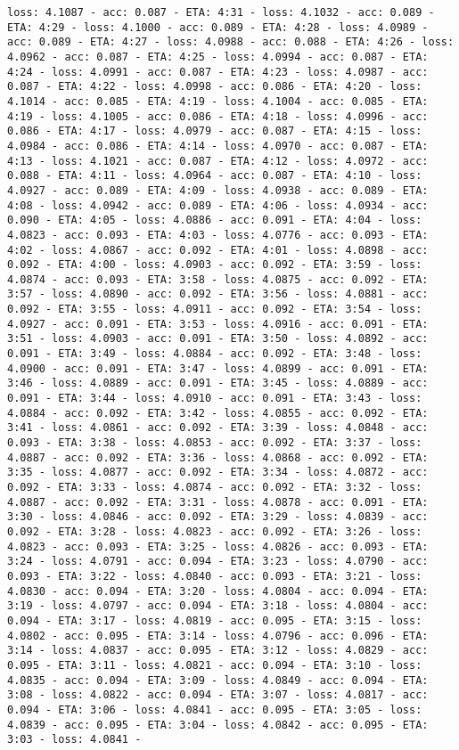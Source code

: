 \documentclass[11pt]{article}
\begin{document}
\begin{Verbatim}[commandchars=\\\{\}]
loss: 4.1087 - acc: 0.087 - ETA: 4:31 - loss: 4.1032 - acc: 0.089 - ETA: 4:29 - loss: 4.1000 - acc: 0.089 - ETA: 4:28 - loss: 4.0989 - acc: 0.089 - ETA: 4:27 - loss: 4.0988 - acc: 0.088 - ETA: 4:26 - loss: 4.0962 - acc: 0.087 - ETA: 4:25 - loss: 4.0994 - acc: 0.087 - ETA: 4:24 - loss: 4.0991 - acc: 0.087 - ETA: 4:23 - loss: 4.0987 - acc: 0.087 - ETA: 4:22 - loss: 4.0998 - acc: 0.086 - ETA: 4:20 - loss: 4.1014 - acc: 0.085 - ETA: 4:19 - loss: 4.1004 - acc: 0.085 - ETA: 4:19 - loss: 4.1005 - acc: 0.086 - ETA: 4:18 - loss: 4.0996 - acc: 0.086 - ETA: 4:17 - loss: 4.0979 - acc: 0.087 - ETA: 4:15 - loss: 4.0984 - acc: 0.086 - ETA: 4:14 - loss: 4.0970 - acc: 0.087 - ETA: 4:13 - loss: 4.1021 - acc: 0.087 - ETA: 4:12 - loss: 4.0972 - acc: 0.088 - ETA: 4:11 - loss: 4.0964 - acc: 0.087 - ETA: 4:10 - loss: 4.0927 - acc: 0.089 - ETA: 4:09 - loss: 4.0938 - acc: 0.089 - ETA: 4:08 - loss: 4.0942 - acc: 0.089 - ETA: 4:06 - loss: 4.0934 - acc: 0.090 - ETA: 4:05 - loss: 4.0886 - acc: 0.091 - ETA: 4:04 - loss: 4.0823 - acc: 0.093 - ETA: 4:03 - loss: 4.0776 - acc: 0.093 - ETA: 4:02 - loss: 4.0867 - acc: 0.092 - ETA: 4:01 - loss: 4.0898 - acc: 0.092 - ETA: 4:00 - loss: 4.0903 - acc: 0.092 - ETA: 3:59 - loss: 4.0874 - acc: 0.093 - ETA: 3:58 - loss: 4.0875 - acc: 0.092 - ETA: 3:57 - loss: 4.0890 - acc: 0.092 - ETA: 3:56 - loss: 4.0881 - acc: 0.092 - ETA: 3:55 - loss: 4.0911 - acc: 0.092 - ETA: 3:54 - loss: 4.0927 - acc: 0.091 - ETA: 3:53 - loss: 4.0916 - acc: 0.091 - ETA: 3:51 - loss: 4.0903 - acc: 0.091 - ETA: 3:50 - loss: 4.0892 - acc: 0.091 - ETA: 3:49 - loss: 4.0884 - acc: 0.092 - ETA: 3:48 - loss: 4.0900 - acc: 0.091 - ETA: 3:47 - loss: 4.0899 - acc: 0.091 - ETA: 3:46 - loss: 4.0889 - acc: 0.091 - ETA: 3:45 - loss: 4.0889 - acc: 0.091 - ETA: 3:44 - loss: 4.0910 - acc: 0.091 - ETA: 3:43 - loss: 4.0884 - acc: 0.092 - ETA: 3:42 - loss: 4.0855 - acc: 0.092 - ETA: 3:41 - loss: 4.0861 - acc: 0.092 - ETA: 3:39 - loss: 4.0848 - acc: 0.093 - ETA: 3:38 - loss: 4.0853 - acc: 0.092 - ETA: 3:37 - loss: 4.0887 - acc: 0.092 - ETA: 3:36 - loss: 4.0868 - acc: 0.092 - ETA: 3:35 - loss: 4.0877 - acc: 0.092 - ETA: 3:34 - loss: 4.0872 - acc: 0.092 - ETA: 3:33 - loss: 4.0874 - acc: 0.092 - ETA: 3:32 - loss: 4.0887 - acc: 0.092 - ETA: 3:31 - loss: 4.0878 - acc: 0.091 - ETA: 3:30 - loss: 4.0846 - acc: 0.092 - ETA: 3:29 - loss: 4.0839 - acc: 0.092 - ETA: 3:28 - loss: 4.0823 - acc: 0.092 - ETA: 3:26 - loss: 4.0823 - acc: 0.093 - ETA: 3:25 - loss: 4.0826 - acc: 0.093 - ETA: 3:24 - loss: 4.0791 - acc: 0.094 - ETA: 3:23 - loss: 4.0790 - acc: 0.093 - ETA: 3:22 - loss: 4.0840 - acc: 0.093 - ETA: 3:21 - loss: 4.0830 - acc: 0.094 - ETA: 3:20 - loss: 4.0804 - acc: 0.094 - ETA: 3:19 - loss: 4.0797 - acc: 0.094 - ETA: 3:18 - loss: 4.0804 - acc: 0.094 - ETA: 3:17 - loss: 4.0819 - acc: 0.095 - ETA: 3:15 - loss: 4.0802 - acc: 0.095 - ETA: 3:14 - loss: 4.0796 - acc: 0.096 - ETA: 3:14 - loss: 4.0837 - acc: 0.095 - ETA: 3:12 - loss: 4.0829 - acc: 0.095 - ETA: 3:11 - loss: 4.0821 - acc: 0.094 - ETA: 3:10 - loss: 4.0835 - acc: 0.094 - ETA: 3:09 - loss: 4.0849 - acc: 0.094 - ETA: 3:08 - loss: 4.0822 - acc: 0.094 - ETA: 3:07 - loss: 4.0817 - acc: 0.094 - ETA: 3:06 - loss: 4.0841 - acc: 0.095 - ETA: 3:05 - loss: 4.0839 - acc: 0.095 - ETA: 3:04 - loss: 4.0842 - acc: 0.095 - ETA: 3:03 - loss: 4.0841 - 
\end{Verbatim}
\end{document}

